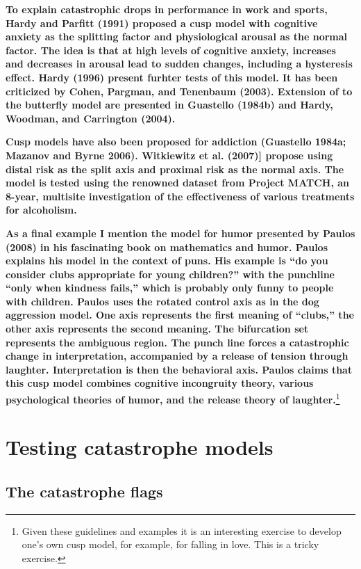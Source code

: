 \documentclass[
  letterpaper,
]{scrbook}
\begin{document}
\textbf{To explain catastrophic drops in performance in work and sports,
Hardy and Parfitt (1991) proposed a cusp model with cognitive anxiety as
the splitting factor and physiological arousal as the normal factor. The
idea is that at high levels of cognitive anxiety, increases and
decreases in arousal lead to sudden changes, including a hysteresis
effect. Hardy (1996) present furhter tests of this model. It has been
criticized by Cohen, Pargman, and Tenenbaum (2003). Extension of to the
butterfly model are presented in Guastello (1984b) and Hardy, Woodman,
and Carrington (2004).}

\textbf{Cusp models have also been proposed for addiction (Guastello
1984a; Mazanov and Byrne 2006). Witkiewitz et al. (2007){]} propose
using distal risk as the split axis and proximal risk as the normal
axis. The model is tested using the renowned dataset from Project MATCH,
an 8-year, multisite investigation of the effectiveness of various
treatments for alcoholism.}

\textbf{As a final example I mention the model for humor presented by
Paulos (2008) in his fascinating book on mathematics and humor. Paulos
explains his model in the context of puns. His example is ``do you
consider clubs appropriate for young children?'' with the punchline
``only when kindness fails,'' which is probably only funny to people
with children. Paulos uses the rotated control axis as in the dog
aggression model. One axis represents the first meaning of ``clubs,''
the other axis represents the second meaning. The bifurcation set
represents the ambiguous region. The punch line forces a catastrophic
change in interpretation, accompanied by a release of tension through
laughter. Interpretation is then the behavioral axis. Paulos claims that
this cusp model combines cognitive incongruity theory, various
psychological theories of humor, and the release theory of
laughter.}\footnote{Given these guidelines and examples it is an
  interesting exercise to develop one's own cusp model, for example, for
  falling in love. This is a tricky exercise.}

\hypertarget{testing-catastrophe-models}{%
\section{Testing catastrophe models}\label{testing-catastrophe-models}}

\hypertarget{the-catastrophe-flags}{%
\subsection{The catastrophe flags}\label{the-catastrophe-flags}}
\end{document}
